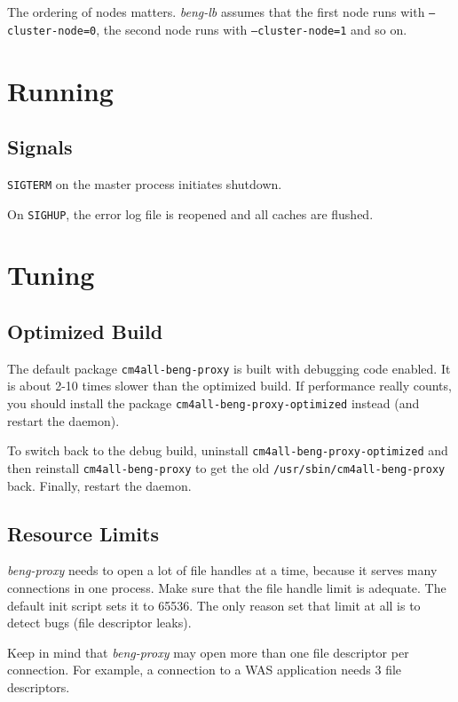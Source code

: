 \documentclass[a4paper,12pt]{article}
\begin{document}
The ordering of nodes matters.  \emph{beng-lb} assumes that the first
node runs with \texttt{--cluster-node=0}, the second node runs with
\texttt{--cluster-node=1} and so on.

\section{Running}

\subsection{Signals}

\texttt{SIGTERM} on the master process initiates shutdown.

On \texttt{SIGHUP}, the error log file is reopened and all caches are
flushed.


\section{Tuning}

\subsection{Optimized Build}

The default package \texttt{cm4all-beng-proxy} is built with debugging
code enabled.  It is about 2-10 times slower than the optimized build.
If performance really counts, you should install the package
\texttt{cm4all\--beng\--proxy\--optimized} instead (and restart the
daemon).

To switch back to the debug build, uninstall
\texttt{cm4all\--beng\--proxy\--op\-ti\-mi\-zed} and then reinstall
\texttt{cm4all\--beng\--proxy} to get the old
\texttt{/usr/sbin/cm4all\--beng\--proxy} back.  Finally, restart the
daemon.

\subsection{Resource Limits}

\emph{beng-proxy} needs to open a lot of file handles at a time,
because it serves many connections in one process.  Make sure that the
file handle limit is adequate.  The default init script sets it to
65536.  The only reason set that limit at all is to detect bugs (file
descriptor leaks).

Keep in mind that \emph{beng-proxy} may open more than one file
descriptor per connection.  For example, a connection to a WAS
application needs 3 file descriptors.
\end{document}
